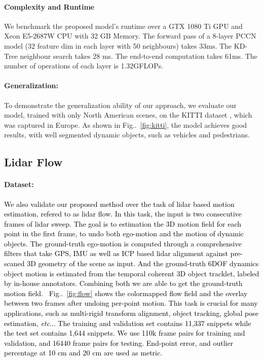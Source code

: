 \documentclass[10pt,twocolumn,letterpaper]{article}
\makeatletter
\newcommand\shenlong[1]{\textcolor{black}{#1}}
\def\@onedot{\ifx\@let@token.\else.\null\fi\xspace}
\DeclareRobustCommand\onedot{\futurelet\@let@token\@onedot}
\newcommand{\figref}[1]{Fig\onedot~\ref{#1}}
\def\etc{\emph{etc}\onedot} \def\vs{\emph{vs}\onedot}
\makeatother
\begin{document}
\paragraph{Complexity and Runtime} We benchmark the proposed model's runtime over a GTX 1080 Ti GPU and Xeon E5-2687W CPU with 32 GB Memory. The forward pass of a 8-layer PCCN model (32 feature dim in each layer with 50 neighbours) takes 33ms.  The KD-Tree neighbour search takes 28 ms. The end-to-end computation takes 61ms. The number of operations of each layer is 1.32GFLOPs. 

\paragraph{Generalization:} To demonstrate the generalization ability of our approach, we evaluate our model, trained with only North American scenes, on the KITTI dataset \cite{kitti}, which was captured in Europe.
As shown in \figref{fig:kitti}, the model achieves good results, with well segmented dynamic objects, such as vehicles and pedestrians. 



\subsection{Lidar Flow}
\paragraph{Dataset:} \shenlong{We also validate our proposed method over the task of lidar based motion estimation, refered to as lidar flow. In this task, the input is two consecutive frames of lidar sweep. The goal is to estimation the 3D motion field for each point in the first frame, to undo both ego-motion and the motion of dynamic objects. The ground-truth ego-motion is computed through a comprehensive filters that take GPS, IMU as well as ICP based lidar alignment against pre-scaned 3D geometry of the scene as input. And the ground-truth 6DOF dynamics object motion is estimated from the temporal coherent 3D object tracklet, labeled by in-house annotators. Combining both we are able to get the ground-truth motion field. ~\figref{fig:flow} shows the colormapped flow field and the overlay between two frames after undoing per-point motion. This task is crucial for many applications, such as multi-rigid transform alignment, object tracking, global pose estimation, \etc. The training and validation set contains 11,337 snippets while the test set contains 1,644 snippets.  We use 110k frame pairs for training and validation, and 16440 frame pairs for testing. End-point error, and outlier percentage at 10 cm and 20 cm are used as metric. }
\end{document}
